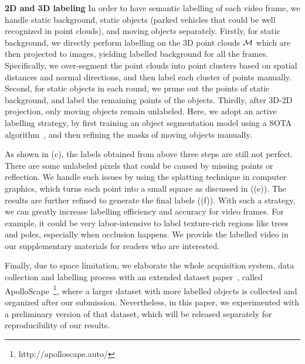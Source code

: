 \textbf{2D and 3D labeling}
In order to have semantic labelling of each video frame, we handle static background, static objects (\eg parked vehicles that could be well recognized in point clouds), and moving objects separately.
Firstly, for static background, we directly perform labelling on the 3D point clouds ${\mathcal M}$ which are then projected to images, yielding labelled background for all the frames.
Specifically, we over-segment the point clouds into point clusters based on spatial distances and normal directions, and then label each cluster of points manually.
Second, for static objects in each round, we prune out the points of static background, and label the remaining points of the objects.
Thirdly, after 3D-2D projection, only moving objects remain unlabeled. Here, we adopt an active labelling strategy, by first training an object segmentation model using a SOTA algorithm~\cite{WuSH16e}, and then refining the masks of moving objects manually.

As shown in (c), the labels obtained from above three steps are still not perfect. There are some unlabeled pixels that could be caused by missing points or reflection. We handle such issues by using the splatting technique in computer graphics, which turns each point into a small square as discussed in  ((e)). The results are further refined to generate the final labels ((f)).
With such a strategy, we can greatly increase labelling efficiency and accuracy for video frames. For example, it could be very labor-intensive to label texture-rich regions like trees and poles, especially when occlusion happens. We provide the labelled video in our supplementary materials for readers who are interested. 

Finally, due to space limitation, we elaborate the whole acquisition system, data collection and labelling process with an extended dataset paper~\cite{huang2018cvprw}, called ApolloScape~\footnote{http://apolloscape.auto/}, where a larger dataset with more labelled objects is collected and organized after our submission. 
Nevertheless, in this paper, we experimented with a preliminary version of that dataset, which will be released separately for reproducibility of our results.


